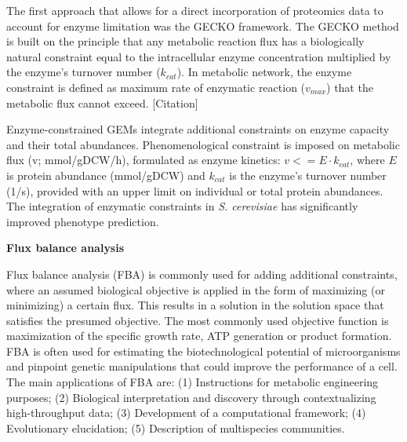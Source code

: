 The first approach that allows for a direct incorporation of proteomics data to account for enzyme limitation
was the GECKO framework. The GECKO method is built on the principle that any metabolic reaction flux has a
biologically natural constraint equal to the intracellular enzyme concentration multiplied by
the enzyme's turnover number ($k_{cat}$). In metabolic network, the enzyme constraint is
defined as maximum rate of enzymatic reaction ($v_{max}$) that the metabolic flux cannot exceed. [Citation] %

Enzyme-constrained GEMs integrate additional constraints on enzyme capacity and
their total abundances. Phenomenological constraint is imposed on metabolic flux (v; mmol/gDCW/h), formulated as enzyme
kinetics: $v <=  E \cdot k_{cat}$, where $E$ is protein abundance (mmol/gDCW) and $k_{cat}$ is the enzyme's turnover number (1/s),
provided with an upper limit on individual or total protein abundances. The integration of
enzymatic constraints in \textit{S. cerevisiae} has significantly improved phenotype prediction. \cite{Rekena2023}


\textbf{Flux balance analysis}


Flux balance analysis (FBA) is commonly used for adding additional constraints, where an
assumed biological objective is applied in the form of maximizing (or minimizing) a certain flux. This results in
a solution in the solution space that satisfies the presumed objective. The most commonly used objective function is maximization of the 
specific growth rate, ATP generation or product formation. FBA is often used for estimating the biotechnological potential of 
microorganisms and pinpoint genetic manipulations that could improve the performance of a cell. The main applications of 
FBA are:
(1) Instructions for metabolic engineering purposes;
(2) Biological interpretation and discovery through
contextualizing high-throughput data;
(3) Development of a computational framework;
(4) Evolutionary elucidation;
(5) Description of multispecies communities. \cite{Kerkhoven2014}


